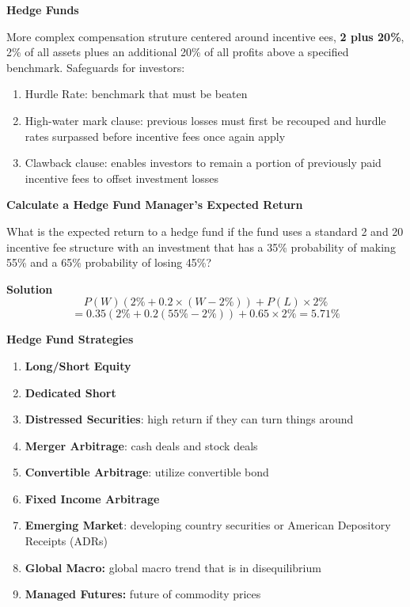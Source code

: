 \documentclass[11pt,fleqn]{report} %
\numberwithin{equation}{section} %
\numberwithin{figure}{section} %
\numberwithin{table}{section} %
\begin{document}
\begin{definition}\textbf{Hedge Funds}

More complex compensation struture centered around incentive ees, \textbf{2 plus 20\%}, 2\% of all assets plues an additional 20\% of all profits above a specified benchmark. Safeguards for investors:
\begin{enumerate}
    \item Hurdle Rate: benchmark that must be beaten
    \item High-water mark clause: previous losses must first be recouped and hurdle rates surpassed before incentive fees once again apply
    \item Clawback clause: enables investors to remain a portion of previously paid incentive fees to offset investment losses
\end{enumerate}
\end{definition}
\begin{exercise}\textbf{Calculate a Hedge Fund Manager's Expected Return}

What is the expected return to a hedge fund if the fund uses a standard 2 and 20
incentive fee structure with an investment that has a 35\% probability of making
55\% and a 65\% probability of losing 45\%?

\textbf{Solution}
$$
P(W)(2\%+0.2\times(W-2\%))+P(L)\times 2\%
$$
$$
=0.35(2\%+0.2(55\%-2\%))+0.65\times 2\%=5.71\%
$$
\end{exercise}

\begin{definition}\textbf{Hedge Fund Strategies}
\begin{enumerate}
    \item \textbf{Long/Short Equity}
    \item \textbf{Dedicated Short}
    \item \textbf{Distressed Securities}: high return if they can turn things around
    \item \textbf{Merger Arbitrage}: cash deals and stock deals
    \item \textbf{Convertible Arbitrage}: utilize convertible bond
    \item \textbf{Fixed Income Arbitrage}
    \item \textbf{Emerging Market}: developing country securities or American Depository Receipts (ADRs)
    \item \textbf{Global Macro:} global macro trend that is in disequilibrium
    \item \textbf{Managed Futures:} future of commodity prices
\end{enumerate}
\end{definition}
\end{document}
